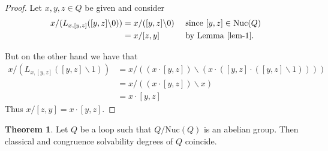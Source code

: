 \documentclass[12pt, twoside, openright]{report}
\theoremstyle{definition}
\newtheorem{thm}{Theorem}[chapter]
\newcommand{\ldv}{\backslash}       %
\newcommand{\rdv}{/}                %
\newcommand{\nuc}{\text{Nuc}}       %
\begin{document}
\begin{proof}
  Let $x, y, z\in Q$ be given and consider
  \begin{alignat*}{2}
    x\rdv(L_{x, [y, z]}([y, z]\ldv 0)) &= x\rdv([y, z]\ldv 0) &&\text{ since $[y, z]\in\nuc(Q)$}\\
    &= x\rdv [z, y] &&\text{ by Lemma \ref{lem-1}.}
  \end{alignat*}

  But on the other hand we have that
  \begin{align*}
    x\rdv(L_{x, [y, z]}([y, z]\ldv 1)) &= x\rdv((x\cdot [y, z])\ldv (x\cdot ([y, z]\cdot([y, z]\ldv 1))))\\
    &= x\rdv((x\cdot [y, z])\ldv x)\\
    &= x\cdot [y, z]
  \end{align*}
  Thus $x\rdv[z, y] = x\cdot [y, z]$.
\end{proof}

\begin{thm}
  Let $Q$ be a loop such that $Q/\nuc(Q)$ is an abelian group. Then classical and congruence
    solvability degrees of $Q$ coincide.
\end{thm}
\end{document}
